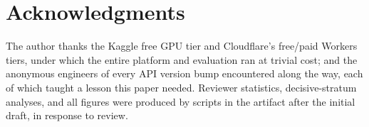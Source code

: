 \documentclass[11pt]{article}
\begin{document}
\section*{Acknowledgments}
The author thanks the Kaggle free GPU tier and Cloudflare's free/paid Workers tiers, under which the entire platform and evaluation ran at trivial cost; and the anonymous engineers of every API version bump encountered along the way, each of which taught a lesson this paper needed. Reviewer statistics, decisive-stratum analyses, and all figures were produced by scripts in the artifact after the initial draft, in response to review.
\end{document}
